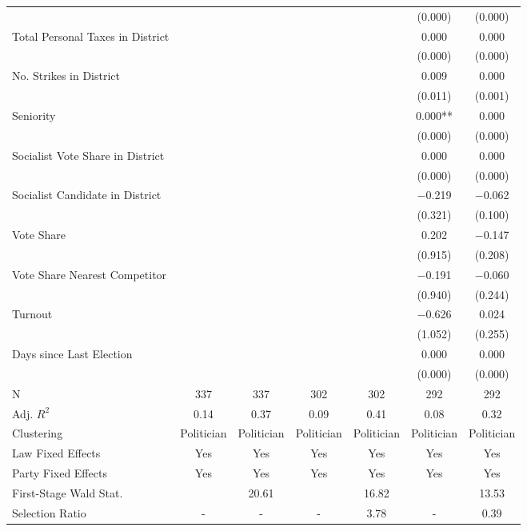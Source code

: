 \begin{table}[!h]
{\begin{threeparttable}
\begin{tabular}[t]{lcccccc}
 &  &  &  &  & (\num{0.000}) & \vphantom{4} (\num{0.000})\\
Total Personal Taxes in District &  &  &  &  & \num{0.000} & \num{0.000}\\
 &  &  &  &  & (\num{0.000}) & \vphantom{3} (\num{0.000})\\
No. Strikes in District &  &  &  &  & \num{0.009} & \num{0.000}\\
 &  &  &  &  & (\num{0.011}) & (\num{0.001})\\
Seniority &  &  &  &  & \num{0.000}** & \num{0.000}\\
 &  &  &  &  & (\num{0.000}) & \vphantom{2} (\num{0.000})\\
Socialist Vote Share in District &  &  &  &  & \num{0.000} & \num{0.000}\\
 &  &  &  &  & (\num{0.000}) & \vphantom{1} (\num{0.000})\\
Socialist Candidate in District &  &  &  &  & \num{-0.219} & \num{-0.062}\\
 &  &  &  &  & (\num{0.321}) & (\num{0.100})\\
Vote Share &  &  &  &  & \num{0.202} & \num{-0.147}\\
 &  &  &  &  & (\num{0.915}) & (\num{0.208})\\
Vote Share Nearest Competitor &  &  &  &  & \num{-0.191} & \num{-0.060}\\
 &  &  &  &  & (\num{0.940}) & (\num{0.244})\\
Turnout &  &  &  &  & \num{-0.626} & \num{0.024}\\
 &  &  &  &  & (\num{1.052}) & (\num{0.255})\\
Days since Last Election &  &  &  &  & \num{0.000} & \num{0.000}\\
 &  &  &  &  & (\num{0.000}) & (\num{0.000})\\
\midrule
N & \num{337} & \num{337} & \num{302} & \num{302} & \num{292} & \num{292}\\
Adj. $R^2$ & \num{0.14} & \num{0.37} & \num{0.09} & \num{0.41} & \num{0.08} & \num{0.32}\\
Clustering & Politician & Politician & Politician & Politician & Politician & Politician\\
Law Fixed Effects & Yes & Yes & Yes & Yes & Yes & Yes\\
Party Fixed Effects & Yes & Yes & Yes & Yes & Yes & Yes\\
First-Stage Wald Stat. &  & 20.61 &  & 16.82 &  & 13.53\\
Selection Ratio & - & - & - & 3.78 & - & 0.39\\

\end{tabular}
\end{threeparttable}}
\end{table}
